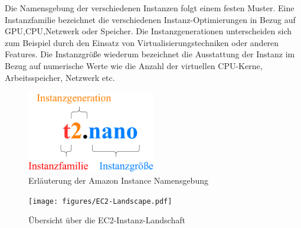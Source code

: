 \documentclass[titlepage]{report}
\begin{document}
\newpage
Die Namensgebung der verschiedenen Instanzen folgt einem festen Muster.
Eine Instanzfamilie bezeichnet die verschiedenen
Instanz\hyp{}Optimierungen in Bezug auf GPU,CPU,Netzwerk oder Speicher.
Die Instanzgenerationen unterscheiden sich zum Beispiel durch den
Einsatz von Virtualisierungstechniken oder anderen Features. Die
Instanzgröße wiederum bezeichnet die Ausstattung der Instanz im Bezug
auf numerische Werte wie die Anzahl der virtuellen CPU\hyp{}Kerne,
Arbeitsspeicher, Netzwerk etc.
\begin{figure}[h]
    \centering
    \includegraphics[width=0.5\textwidth]{figures/instance.pdf}
    \caption{Erläuterung der Amazon Instance Namensgebung}\label{fig:2}
\end{figure}
\begin{figure}[h]
    \centering
    \texttt{[image: figures/EC2-Landscape.pdf]}
    \caption{Übersicht über die EC2\hyp{}Instanz\hyp{}Landschaft}\label{fig:3}
\end{figure}
\newpage
\end{document}

